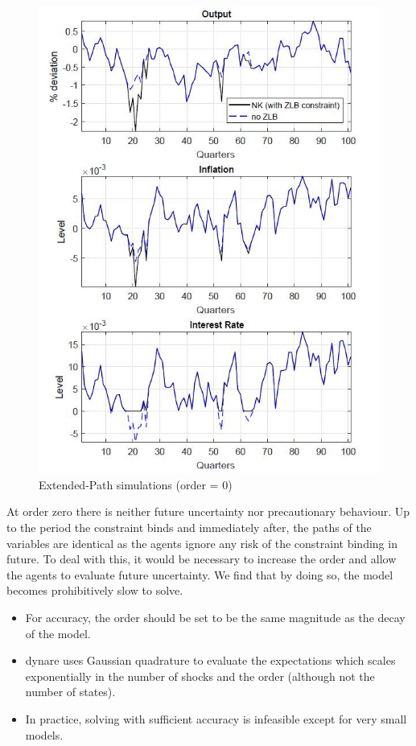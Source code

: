\documentclass[cn,10pt,math=newtx,citestyle=gb7714-2015,bibstyle=gb7714-2015]{elegantbook}
\begin{document}
\begin{figure}[htbp!]
	\centering
	\includegraphics[width=0.8\linewidth]{FIG/extendedpath}
	\caption{Extended-Path simulations (order = 0)}\label{4.2}
	\centering
\end{figure}

At order zero there is neither future uncertainty nor precautionary behaviour. Up to the period the constraint binds and immediately after, the paths of the variables are identical as the agents ignore any risk of the constraint binding in
future. To deal with this, it would be necessary to increase the order and allow the agents to evaluate future uncertainty. We find that by doing so, the model becomes prohibitively slow to solve.

\begin{itemize}
	\item For accuracy, the order should be set to be the same magnitude as the decay of the model.
	\item dynare uses Gaussian quadrature to evaluate the expectations which scales exponentially in the number of shocks and the order (although not the number of states).
	\item In practice, solving with sufficient accuracy is infeasible except for very small models.
	
\end{itemize}
\end{document}
